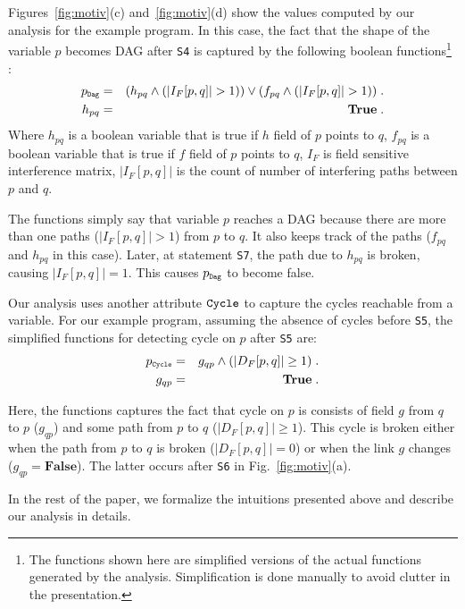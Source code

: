 \documentclass[runningheads,a4paper]{llncs}
\newcommand{\p}{\ensuremath{p}}
\newcommand{\q}{\ensuremath{q}}
\newcommand{\subC}{\mbox{\scalebox{.6}{\Cycle}}}
\newcommand{\subD}{\mbox{\scalebox{.6}{\Dag}}}
\newcommand{\num}[1]{\ensuremath{|#1|}}
\newcommand{\DFM}[2]{\ensuremath{D_F[#1,#2]}}
\newcommand{\IFM}[2]{\ensuremath{I_F[#1,#2]}}
\newcommand{\Dag}{{\tt Dag}}
\newcommand{\Cycle}{{\tt Cycle}}
\newcommand{\false}{\textbf{False}}
\newcommand{\true}{\textbf{True}}
\begin{document}
\begin{example}
{Figures~\ref{fig:motiv}(c) and~\ref{fig:motiv}(d) show the
values computed by our analysis for the example program.  In
this case, the fact that the shape of the variable $\p$
becomes DAG after {\tt S4} is captured by the following
boolean functions\footnote{The functions shown here are
  simplified versions of the actual functions generated by
  the analysis. Simplification is done manually to avoid
  clutter in the presentation.} :
\begin{eqnarray*}
  p_{\subD} &=&   (h_{pq} \wedge (\num{\IFM{p}{q}} > 1)) \vee
  (f_{pq} \wedge (\num{\IFM{p}{q}} > 1)) \; . \\ 
  h_{pq} &=& \true \; .
\end{eqnarray*}
Where $h_{pq}$ is a boolean variable that is true if $h$
field of $\p$ points to $\q$, $f_{pq}$ is a boolean
variable that is true if $f$ field of $\p$ points to
$\q$, $I_F$ is field sensitive interference matrix,
$\num{I_F[p,q]}$ is the count of number of interfering paths
between $\p$ and $\q$. 

The functions simply say that variable $\p$ reaches a
DAG because there are more than one paths ($\num{I_F[p,q]} > 1$)
from $\p$ to $\q$. It also keeps track of the paths
($f_{pq}$ and $h_{pq}$ in this case).  Later, at statement
{\tt S7}, the path due to $h_{pq}$ is broken, causing
$\num{I_F[p,q]} = 1$. This causes $\p_{\subD}$ to become false.

Our analysis uses  another attribute ${\Cycle}$ to capture the
cycles reachable  from a  variable. For our  example program,
assuming  the   absence  of  cycles  before   {\tt  S5},  the
simplified  functions for  detecting cycle  on $\p$ after
{\tt S5} are:
\begin{eqnarray*}
p_{\subC} &=& g_{qp} \wedge (\num{\DFM{p}{q}} \geq 1) \; .  \\
g_{qp} &=& \true \; .
\end{eqnarray*}

Here, the functions captures the fact that cycle on $\p$
is consists of field $g$ from $\q$ to $\p$ ($g_{qp}$)
and some path from $\p$ to $\q$ ($\num{\DFM{p}{q}} \geq
1$). This cycle is broken either when the path from $\p$
to $\q$ is broken ($\num{\DFM{p}{q}} = 0$) or when the link $g$
changes ($g_{qp} = \false$). The latter occurs after
{\tt S6} in Fig.~\ref{fig:motiv}(a).  
}
\hfill\psframebox{}  
\end{example}

In the rest of the paper, we formalize the intuitions
presented above and describe our analysis in details.
\end{document}
